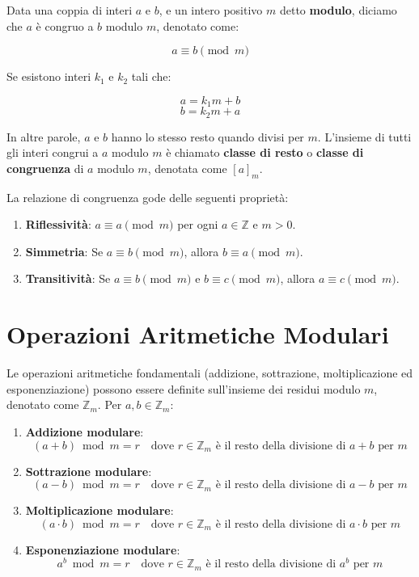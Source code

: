 \documentclass[a4paper,12pt]{report}
\begin{document}
Data una coppia di interi $a$ e $b$, e un intero positivo $m$ detto \textbf{modulo}, diciamo che $a$ è congruo a $b$ modulo $m$, denotato come:

$$a \equiv b \pmod{m}$$

Se esistono interi $k_1$ e $k_2$ tali che:

$$a = k_1m + b$$
$$b = k_2m + a$$

In altre parole, $a$ e $b$ hanno lo stesso resto quando divisi per $m$. L'insieme di tutti gli interi congrui a $a$ modulo $m$ è chiamato \textbf{classe di resto} o \textbf{classe di congruenza} di $a$ modulo $m$, denotata come $[a]_m$.

La relazione di congruenza gode delle seguenti proprietà:

\begin{enumerate}
   \item \textbf{Riflessività}: $a \equiv a \pmod{m}$ per ogni $a \in \mathbb{Z}$ e $m > 0$.
   \item \textbf{Simmetria}: Se $a \equiv b \pmod{m}$, allora $b \equiv a \pmod{m}$.
   \item \textbf{Transitività}: Se $a \equiv b \pmod{m}$ e $b \equiv c \pmod{m}$, allora $a \equiv c \pmod{m}$.
\end{enumerate}
\newpage
\section{Operazioni Aritmetiche Modulari}
Le operazioni aritmetiche fondamentali (addizione, sottrazione, moltiplicazione ed esponenziazione) possono essere definite sull'insieme dei residui modulo $m$, denotato come $\mathbb{Z}_m$. Per $a, b \in \mathbb{Z}_m$:

\begin{enumerate}
   \item \textbf{Addizione modulare}:
   $$(a + b) \bmod m = r \quad \text{dove } r \in \mathbb{Z}_m \text{ è il resto della divisione di } a+b \text{ per } m$$
   
   \item \textbf{Sottrazione modulare}:
   $$(a - b) \bmod m = r \quad \text{dove } r \in \mathbb{Z}_m \text{ è il resto della divisione di } a-b \text{ per } m$$
   
   \item \textbf{Moltiplicazione modulare}:
   $$(a \cdot b) \bmod m = r \quad \text{dove } r \in \mathbb{Z}_m \text{ è il resto della divisione di } a \cdot b \text{ per } m$$
   
   \item \textbf{Esponenziazione modulare}:
   $$a^b \bmod m = r \quad \text{dove } r \in \mathbb{Z}_m \text{ è il resto della divisione di } a^b \text{ per } m$$
\end{enumerate}
\end{document}
